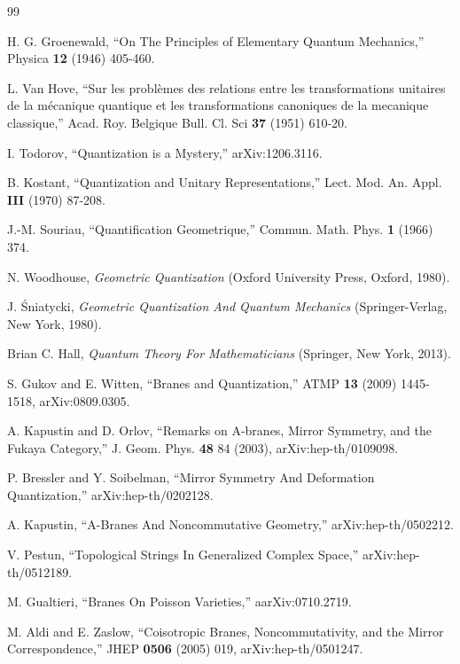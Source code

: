 
\begin{thebibliography}{99}



 H. G. Groenewald, ``On The Principles of Elementary Quantum Mechanics,''  Physica {\bf 12} (1946) 405-460.

 L. Van Hove,  ``Sur les probl\`{e}mes des relations entre les transformations
unitaires de la m\'{e}canique quantique et les transformations canoniques
de la mecanique classique,'' Acad. Roy. Belgique Bull. Cl. Sci {\bf 37} (1951) 610-20.

I. Todorov, ``Quantization is a Mystery,'' arXiv:1206.3116.

 B. Kostant, ``Quantization and Unitary Representations,''
Lect. Mod. An. Appl. {\bf III} (1970) 87-208.

 J.-M. Souriau,  ``Quantification Geometrique,'' Commun. Math. Phys.
{\bf 1} (1966) 374.

 N. Woodhouse, {\it Geometric Quantization} (Oxford University Press, Oxford, 1980).

J. \'{S}niatycki, {\it Geometric Quantization And Quantum Mechanics} (Springer-Verlag, New York, 1980).

Brian C. Hall, {\it Quantum Theory For Mathematicians} (Springer, New York, 2013).


S. Gukov and E. Witten, ``Branes and Quantization,'' ATMP {\bf 13} (2009) 1445-1518, arXiv:0809.0305.

A. Kapustin and D. Orlov, ``Remarks on A-branes, Mirror Symmetry, and the Fukaya
Category,'' J. Geom. Phys. {\bf 48} 84 (2003), arXiv:hep-th/0109098.

 P. Bressler and Y. Soibelman, ``Mirror Symmetry And Deformation Quantization,''
arXiv:hep-th/0202128.



  A. Kapustin, ``A-Branes And Noncommutative Geometry,''  arXiv:hep-th/0502212.

V. Pestun, ``Topological Strings In Generalized Complex Space,'' arXiv:hep-th/0512189.

 M. Gualtieri, ``Branes On Poisson Varieties,'' aarXiv:0710.2719.

M. Aldi and E. Zaslow, ``Coisotropic Branes, Noncommutativity, and the Mirror Correspondence,''
JHEP {\bf 0506} (2005) 019, arXiv:hep-th/0501247.



\end{thebibliography}
